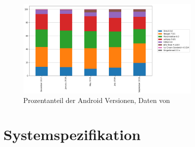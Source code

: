 \documentclass[a4paper]{scrreprt}
\begin{document}
\begin{figure}
	\centering
	\includegraphics[keepaspectratio,width=0.8\textwidth]{AndroidMarketshare}
	\caption{Prozentanteil der Android Versionen, Daten von \cite{Fossbytes2018}}
	\label{fig:AndroidMarketshare}
\end{figure}


\newpage
\section{Systemspezifikation}
\label{sec:SysSpec}
\end{document}
